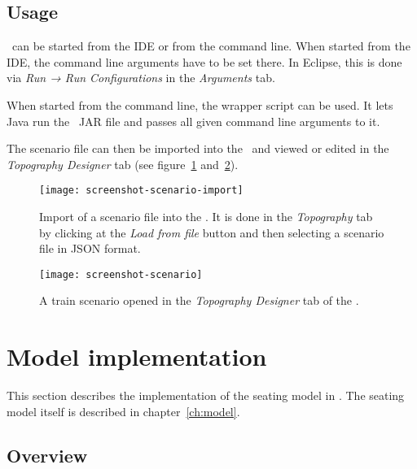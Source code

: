 \FloatBarrier

\subsection{Usage}

\traingen\ can be started from the \acs{IDE} or from the command line.
When started from the \acs{IDE}, the command line arguments have to be set
there.
In Eclipse, this is done via \emph{Run → Run Configurations} in the
\emph{Arguments} tab.

When started from the command line, the wrapper script  can be
used.
It lets Java run the \traingen\ \acs{JAR} file and passes all given command
line arguments to it.

The scenario file can then be imported into the \vaderegui\ and viewed or edited
in the \emph{Topography Designer} tab (see
figure~\ref{fig:screenshot-scenario-import} and~\ref{fig:screenshot-scenario}).

\begin{figure}[htb]
  \centering
  \texttt{[image: screenshot-scenario-import]}
  \caption[Import of a scenario file into the \vaderegui.]{%
    Import of a scenario file into the \vaderegui.
    It is done in the \emph{Topography} tab by clicking at the \emph{Load from
    file} button and then selecting a scenario file in \acs{JSON} format.
  }\label{fig:screenshot-scenario-import}
\end{figure}

\begin{figure}[htb]
  \centering
  \texttt{[image: screenshot-scenario]}
  \caption[A train scenario opened in the \emph{Topography Designer} tab.]{%
  A train scenario opened in the \emph{Topography Designer} tab of the
  \vaderegui.
  }\label{fig:screenshot-scenario}
\end{figure}

\FloatBarrier

\section{Model implementation}
\label{sec:model-implementation}

This section describes the implementation of the seating model in \vadere.
The seating model itself is described in chapter~\ref{ch:model}.

\subsection{Overview}

